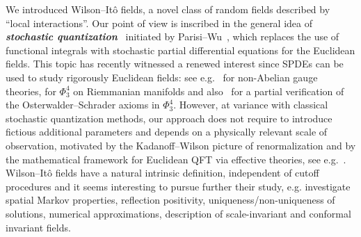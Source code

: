 \documentclass[reprint,aps]{revtex4-2}
\newcommand{\tmtextbf}[1]{\textbf{{{#1}}}}
\newcommand{\tmtextit}[1]{\textit{{{#1}}}}
\begin{document}
We introduced Wilson--It{\^o} fields, a novel class of random fields described
by ``local interactions''. Our point of view is inscribed in the general idea
of \tmtextbf{\tmtextit{stochastic
quantization}}~{\cite{damgaardStochasticQuantization1988}} initiated by
Parisi--Wu~{\cite{parisiPerturbationTheoryGauge1981}}, which replaces the use
of functional integrals with stochastic partial differential equations for the
Euclidean fields. This topic has recently witnessed a renewed interest since
SPDEs can be used to study rigorously Euclidean fields: see e.g.~
{\cite{chandraLangevinDynamic2D2020,chandraStochasticQuantisationYangMillsHiggs2022,chevyrevInvariantMeasureUniversality2023}}
for non-Abelian gauge theories,
{\cite{bailleulPhiMeasuresCompact2023,bailleulUniquenessPhiMeasures2023}} for
$\Phi^4_3$ on Riemmanian manifolds and also~{\cite{GH21}} for a partial
verification of the Osterwalder--Schrader axioms in $\Phi^4_3$. However, at
variance with classical stochastic quantization methods, our approach does not
require to introduce fictious additional parameters and depends on a
physically relevant scale of observation, motivated by the Kadanoff--Wilson
picture of renormalization and by the mathematical framework for Euclidean QFT
via effective theories, see
e.g.~{\cite{costelloRenormalizationEffectiveField2011,salmhoferRenormalizationIntroduction2007,rychkovEPFLLecturesConformal2016}}.
Wilson--It{\^o} fields have a natural intrinsic definition, independent of
cutoff procedures and it seems interesting to pursue further their study, e.g.
investigate spatial Markov properties, reflection positivity,
uniqueness/non-uniqueness of solutions, numerical approximations, description
of scale-invariant and conformal invariant fields.
\end{document}
